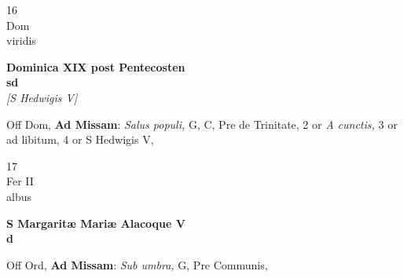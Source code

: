 \documentclass[10pt, openany]{book}
\begin{document}
        \begin{center}
            \begin{minipage}{3.5in}
                \vspace{2em}
                \begin{minipage}{0.5in}
                    {\Huge 16} \\
                    {\normalsize Dom} \\
                    {\normalsize viridis}
                \end{minipage}
                \begin{minipage}{3.0in}
                    \textbf{ \large Dominica XIX post Pentecosten \\
                    \textnormal{\normalsize sd}} \\ \textit{[S Hedwigis V]} \\ 
                \end{minipage}
                \begin{justify}Off Dom, \textbf{Ad Missam}: \textit{Salus populi,} G, C, Pre de Trinitate, 2 or \textit{A cunctis,} 3 or ad libitum, 4 or S Hedwigis V,  
                \end{justify}
            \end{minipage}
        \end{center}
    
        \begin{center}
            \begin{minipage}{3.5in}
                \vspace{2em}
                \begin{minipage}{0.5in}
                    {\Huge 17} \\
                    {\normalsize Fer II} \\
                    {\normalsize albus}
                \end{minipage}
                \begin{minipage}{3.0in}
                    \textbf{ \large S Margaritæ Mariæ Alacoque V \\
                    \textnormal{\normalsize d}} \\ 
                \end{minipage}
                \begin{justify}Off Ord, \textbf{Ad Missam}: \textit{Sub umbra,} G, Pre Communis,  
                \end{justify}
            \end{minipage}
        \end{center}
    
\end{document}
